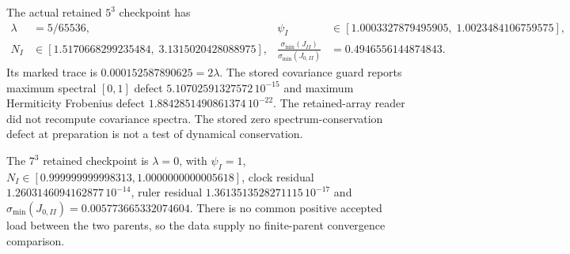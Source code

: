 \documentclass[11pt]{article}
\begin{document}
The actual retained $5^3$ checkpoint has
\begin{equation}
\begin{aligned}
 \lambda&=5/65536,&
 \psi_I&\in[1.0003327879495905,\;1.0023484106759575],\\
 N_I&\in[1.5170668299235484,\;3.1315020428088975],&
 \frac{\sigma_{\min}(J_{II})}{\sigma_{\min}(J_{0,II})}
   &=0.4946556144874843 .
\end{aligned}
\tag{XR3}
\end{equation}
Its marked trace is $0.000152587890625=2\lambda$.
The stored covariance guard reports maximum spectral
$[0,1]$ defect $5.10702591327572\,10^{-15}$ and maximum
Hermiticity Frobenius defect $1.8842851490861374\,10^{-22}$.
The retained-array reader did not recompute covariance spectra.
The stored zero spectrum-conservation defect at preparation is
not a test of dynamical conservation.

The $7^3$ retained checkpoint is $\lambda=0$, with $\psi_I=1$,
$N_I\in[0.999999999998313,1.0000000000005618]$,
clock residual $1.2603146094162877\,10^{-14}$, ruler residual
$1.3613513528271115\,10^{-17}$ and
$\sigma_{\min}(J_{0,II})=0.005773665332074604$.
There is no common positive accepted load between the two parents,
so the data supply no finite-parent convergence comparison.
\end{document}
